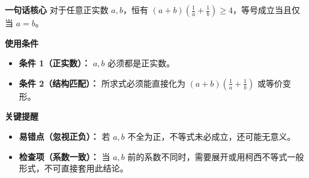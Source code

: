 \begin{summarybox}
	\textbf{\textcolor{CSummary}{一句话核心}}
	对于任意正实数 $a,b$，恒有 $(a+b)\left(\frac{1}{a}+\frac{1}{b}\right)\ge4$，等号成立当且仅当 $a=b$。

	\medskip
	\textbf{\textcolor{CSummary}{使用条件}}
	\begin{itemize}[leftmargin=*, itemsep=0.5em, topsep=0.4em]
		\item \textbf{条件 1（正实数）：} $a,b$ 必须都是正实数。
		\item \textbf{条件 2（结构匹配）：} 所求式必须能直接化为 $(a+b)\left(\frac{1}{a}+\frac{1}{b}\right)$ 或等价变形。
	\end{itemize}

	\medskip
	\textbf{\textcolor{CSummary}{关键提醒}}
	\begin{itemize}[leftmargin=*, itemsep=0.5em, topsep=0.4em]
		\item \textbf{易错点（忽视正负）：} 若 $a,b$ 不全为正，不等式未必成立，还可能无意义。
		\item \textbf{检查项（系数一致）：} 当 $a,b$ 前的系数不同时，需要展开或用柯西不等式一般形式，不可直接套用此结论。
	\end{itemize}

\end{summarybox}
